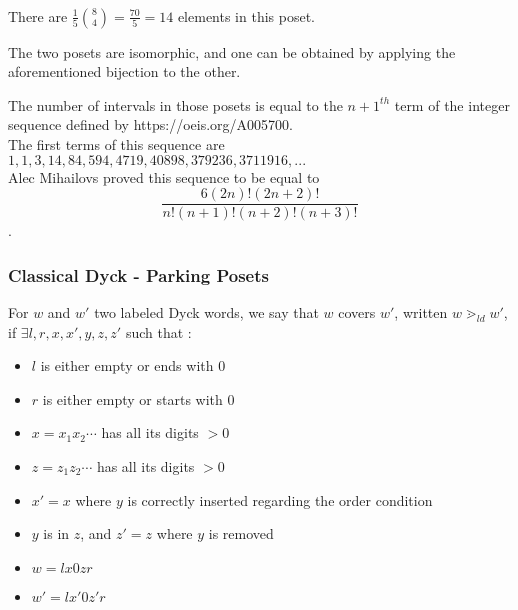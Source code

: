 \begin{example}
    ~\\
    \begin{center}
        
        There are $\frac {1}{5} \binom{8}{4} = \frac{70}{5} = 14$
        elements in this poset.
    \end{center}
\end{example}

\begin{rem}
    The two posets are isomorphic, and one can be obtained by
    applying the aforementioned bijection to the other.
\end{rem}

\begin{theorem}
    The number of intervals in those posets is equal to
    the $n+1^{th}$ term of the integer sequence defined by
    https://oeis.org/A005700.\\
    The first terms of this sequence are $1, 1, 3, 14, 84,
    594, 4719, 40898, 379236, 3711916, ...$\\
    Alec Mihailovs proved this sequence to be equal to
    $$\frac {6 (2n)! (2n+2)!}{n!(n+1)!(n+2)!(n+3)!}$$.
\end{theorem}

\subsubsection{Classical Dyck - Parking Posets}

\begin{definition}[$\gtrdot_{ld}$]
    For $w$ and $w'$ two labeled Dyck words, we say
    that $w$ covers $w'$, written $w \gtrdot_{ld} w'$,
    if $\exists l, r, x, x', y, z, z'$ such that :
    \begin{itemize}
        \item $l$ is either empty or ends with $0$
        \item $r$ is either empty or starts with $0$
        \item $x = x_1x_2 \cdots$ has all its digits $> 0$
        \item $z = z_1z_2 \cdots$ has all its digits $> 0$
        \item $x' = x$ where $y$ is correctly inserted
            regarding the order condition
        \item $y$ is in $z$, and $z' = z$ where $y$ is removed
        \item $w = lx0zr$
        \item $w' = lx'0z'r$
    \end{itemize}  
\end{definition}

